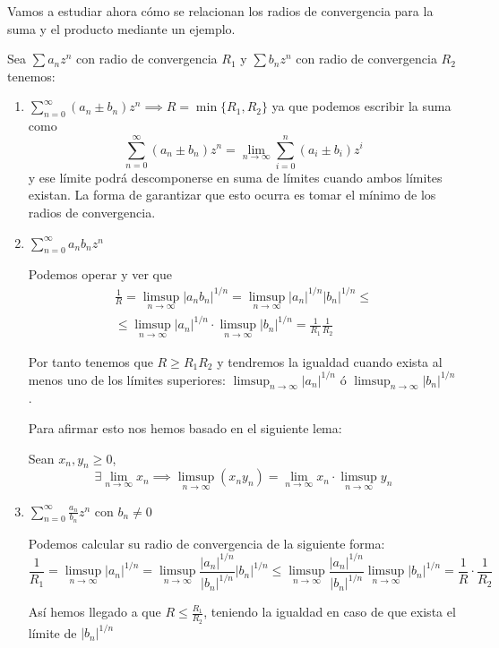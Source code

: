 \documentclass{apuntes}
\begin{document}
Vamos a estudiar ahora cómo se relacionan los radios de convergencia para la suma y el producto mediante un ejemplo.
\begin{example}
Sea $\sum a_nz^n$ con radio de convergencia $R_1$ y $\sum b_n z^n$ con radio de convergencia $R_2$ tenemos:
\begin{enumerate}
\item $\displaystyle \sum_{n=0}^{\infty}(a_n\pm b_n)z^n \implies R = \min\{R_1, R_2\}$
ya que podemos escribir la suma como
\[\sum_{n=0}^{\infty}(a_n\pm b_n)z^n = \lim_{n \to \infty} \sum_{i=0}^n (a_i\pm b_i)z^i\]
y ese límite podrá descomponerse en suma de límites cuando ambos límites existan. La forma de garantizar que esto ocurra es tomar el mínimo de los radios de convergencia.

\item $\displaystyle  \sum_{n=0}^{\infty} a_nb_nz^n$

Podemos operar y ver que
\begin{multline*} \frac{1}{R}=\limsup_{ n \to \infty}|a_nb_n|^{1/n} = \limsup_{n\to \infty}|a_n|^{1/n}|b_n|^{1/n} \leq\\
\leq \limsup_{n\to \infty} |a_n|^{1/n}\cdot \limsup_{n\to \infty} |b_n|^{1/n} = \frac{1}{R_1}\frac{1}{R_2} \end{multline*}

Por tanto tenemos que $R \geq R_1R_2$ y tendremos la igualdad cuando exista al menos uno de los límites superiores: $\limsup_{n\to \infty} |a_n|^{1/n}$ ó $\limsup_{n\to \infty}|b_n|^{1/n}$.

Para afirmar esto nos hemos basado en el siguiente lema:
\begin{lemma}
Sean $x_n,y_n \geq 0$,
\[\exists \lim_{n \to \infty} x_n \implies \limsup_{n \to \infty }(x_ny_n)=\lim_{n \to \infty}x_n \cdot \limsup_{n \to \infty} y_n\]
\end{lemma}

\item $\displaystyle \sum_{n = 0}^{\infty} \frac{a_n}{b_n}z^n \text{ con } b_n \neq 0$

Podemos calcular su radio de convergencia de la siguiente forma:
\[\frac{1}{R_1}=\limsup_{n \to \infty} |a_n|^{1/n} = \limsup_{n \to \infty} \frac{|a_n|^{1/n}}{|b_n|^{1/n}}|b_n|^{1/n} \leq \limsup_{n \to \infty} \frac{|a_n|^{1/n}}{|b_n|^{1/n}}\limsup_{n \to \infty} |b_n|^{1/n}=\frac{1}{R}\cdot \frac{1}{R_2}\]

Así hemos llegado a que $R \leq \frac{R_1}{R_2}$, teniendo la igualdad en caso de que exista el límite de $|b_n|^{1/n}$


\end{enumerate}
\end{example}
\end{document}
